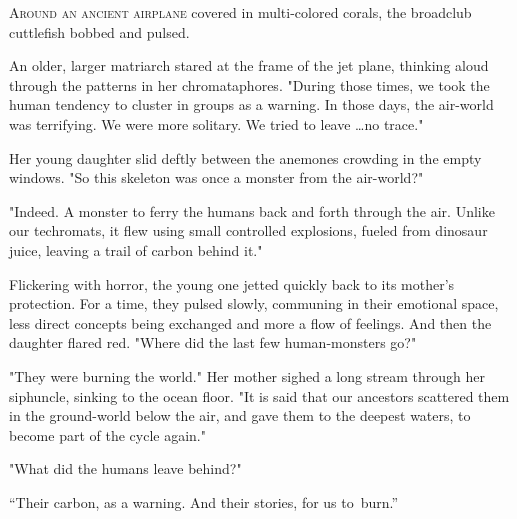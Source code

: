 
\lettrine{A}{round an ancient airplane} covered in multi-colored corals, the
broadclub cuttlefish bobbed and pulsed.

An older, larger matriarch stared at the frame of the jet plane,
thinking aloud through the patterns in her chromataphores. "During those
times, we took the human tendency to cluster in groups as a warning. In
those days, the air-world was terrifying. We were more solitary. We
tried to leave \ldots no trace."

Her young daughter slid deftly between the anemones crowding in the
empty windows. "So this skeleton was once a monster from the air-world?"

"Indeed. A monster to ferry the humans back and forth through the air.
Unlike our techromats, it flew using small controlled explosions, fueled
from dinosaur juice, leaving a trail of carbon behind it."

Flickering with horror, the young one jetted quickly back to its
mother's protection. For a time, they pulsed slowly, communing in their
emotional space, less direct concepts being exchanged and more a flow of
feelings. And then the daughter flared red. "Where did the last few
human-monsters go?"

"They were burning the world." Her mother sighed a long stream through
her siphuncle, sinking to the ocean floor. "It is said that our
ancestors scattered them in the ground-world below the air, and gave
them to the deepest waters, to become part of the cycle again."

"What did the humans leave behind?"

``Their carbon, as a warning. And their stories, for us \mbox{to burn.''}
